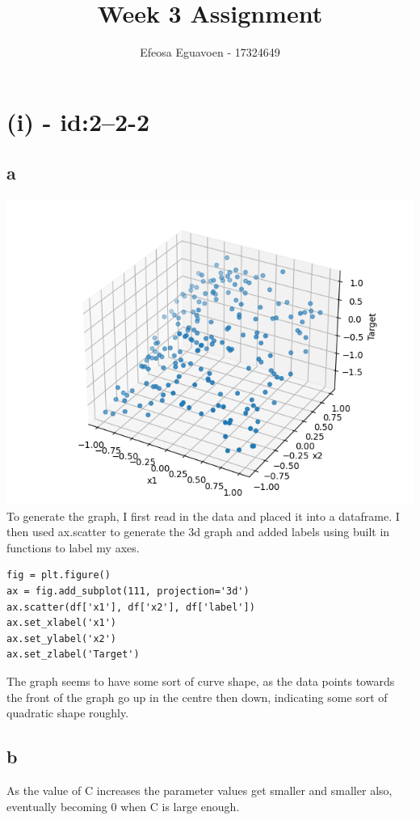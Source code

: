 \documentclass[11pt]{article} %
\title{Week 3 Assignment}
\author{Efeosa Eguavoen - 17324649}
\begin{document}
\maketitle

\section{(i) - id:2--2-2}
\subsection{a}
\includegraphics[scale=0.5]{3Ddata.jpg}
\\
To generate the graph, I first read in the data and placed it into a dataframe. I then used ax.scatter to generate the 3d graph and added labels using built in functions to label my axes. 
\begin{verbatim}
fig = plt.figure()
ax = fig.add_subplot(111, projection='3d')
ax.scatter(df['x1'], df['x2'], df['label'])
ax.set_xlabel('x1')
ax.set_ylabel('x2')
ax.set_zlabel('Target')
\end{verbatim}
The graph seems to have some sort of curve shape, as the data points towards the front of the graph go up in the centre then down, indicating some sort of quadratic shape roughly. 

\subsection{b}
As the value of C increases the parameter values get smaller and smaller also, eventually becoming 0 when C is large enough. 
\end{document}
